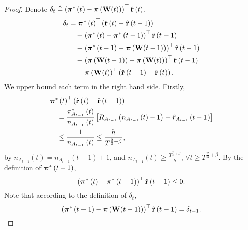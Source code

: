 \begin{proof}
    Denote $\delta_t \triangleq \left( {{\boldsymbol{\pi}}^*\left(t\right)} - {\boldsymbol{\pi}}\left( {\mathbf{W}}(t) \right) \right)^\top \hat{{\mathbf{r}}}\left(t\right)$.
\begin{equation}
\label{eq:dynamic_regret_decomposition}
\begin{split}
    \delta_t &= {{\boldsymbol{\pi}}^*\left(t\right)}^\top \left( \hat{{\mathbf{r}}}\left(t\right) - \hat{{\mathbf{r}}}\left(t-1\right)\right) \\
    &\quad + \left( {{\boldsymbol{\pi}}^*\left(t\right)} - {{\boldsymbol{\pi}}^*\left(t-1\right)} \right)^\top \hat{{\mathbf{r}}} \left(t-1\right) \\
    &\quad + \left( {{\boldsymbol{\pi}}^*\left(t-1\right)} - {\boldsymbol{\pi}}\left( {\mathbf{W}}(t-1) \right) \right)^\top \hat{{\mathbf{r}}}\left(t-1\right) \\
    &\quad + \left(  {\boldsymbol{\pi}}\left( {\mathbf{W}}(t-1) \right) - {\boldsymbol{\pi}}\left( {\mathbf{W}}(t) \right) 
    \right)^\top \hat{{\mathbf{r}}}\left(t-1\right) \\
    &\quad + {\boldsymbol{\pi}}\left( {\mathbf{W}}(t) \right)^\top \left( \hat{{\mathbf{r}}}\left(t-1\right) - \hat{{\mathbf{r}}}\left(t\right) \right).
\end{split}
\end{equation}
We upper bound each term in the right hand side. Firstly,
\begin{equation*}
\begin{split}
    &{{\boldsymbol{\pi}}^*\left(t\right)}^\top \left( \hat{{\mathbf{r}}}\left(t\right) - \hat{{\mathbf{r}}}\left(t-1\right)\right) \\
    &\quad = \frac{{\pi_{ A_{t-1}}^*\left(t\right)}}{n_{ A_{t-1}}\left(t\right)} \left[ R_{ A_{t-1}}\left( n_{ A_{t-1}}\left(t\right) -1 \right) - \hat{r}_{ A_{t-1}}\left(t-1\right) \right] \\
    &\quad \le \frac{1}{n_{A_{t-1}}\left(t\right)} \le \frac{h}{T^{\frac{2}{3} + \beta}},
\end{split}
\end{equation*}
by $n_{A_{t-1}}\left(t\right) = n_{ A_{t-1}}\left(t-1\right) + 1$, and $n_{ A_{t-1}}\left(t\right) \ge \frac{T^{\frac{2}{3} + \beta}}{h}$, $\forall t \ge T^{\frac{2}{3} + \beta}$. By the definition of ${{\boldsymbol{\pi}}^*\left(t-1\right)}$,
\begin{equation*}
    \left( {{\boldsymbol{\pi}}^*\left(t\right)} - {{\boldsymbol{\pi}}^*\left(t-1\right)} \right)^\top \hat{{\mathbf{r}}}\left(t-1\right) \le 0.
\end{equation*}
Note that according to the definition of $\delta_t$,
\begin{equation*}
    \left( {\rvpi^*\left(t-1\right)} - \rvpi\left( \rmW(t-1) \right) \right)^\top \hat{\rvr}\left(t-1\right) = \delta_{t-1}.

\end{equation*}
\end{proof}
